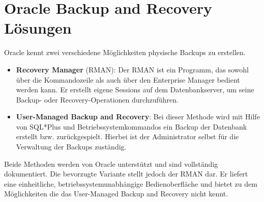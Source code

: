     \section{Oracle Backup and Recovery L\"osungen}
      Oracle kennt zwei verschiedene M\"oglichkeiten physische Backups zu erstellen.
      \begin{itemize}
        \item \textbf{Recovery Manager} (RMAN): Der RMAN ist ein Programm, das sowohl \"uber die Kommandozeile als auch \"uber den Enterprise Manager bedient werden kann. Er erstellt eigene Sessions auf dem Datenbankserver, um seine Backup- oder Recovery-Operationen durchzuf\"uhren.

        \item \textbf{User-Managed Backup and Recovery}: Bei dieser Methode wird mit Hilfe von SQL*Plus und Betriebssystemkommandos ein Backup der Datenbank erstellt bzw. zur\"uckgespielt. Hierbei ist der Administrator selbst f\"ur die Verwaltung der Backups zust\"andig.
      \end{itemize}
      Beide Methoden werden von Oracle unterst\"utzt und sind vollst\"andig dokumentiert. Die bevorzugte Variante stellt jedoch der RMAN dar. Er liefert eine einheitliche, betriebssystemunabh\"angige Bedienoberfl\"ache und bietet zu dem M\"oglichkeiten die das User-Managed Backup and Recovery nicht kennt.

